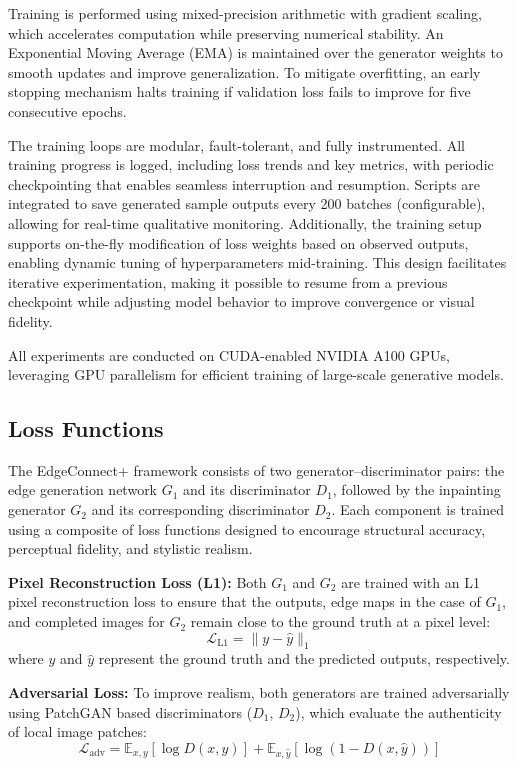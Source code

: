 Training is performed using mixed-precision arithmetic with gradient scaling, which accelerates computation while preserving numerical stability. An Exponential Moving Average (EMA) is maintained over the generator weights to smooth updates and improve generalization. To mitigate overfitting, an early stopping mechanism halts training if validation loss fails to improve for five consecutive epochs.

The training loops are modular, fault-tolerant, and fully instrumented. All training progress is logged, including loss trends and key metrics, with periodic checkpointing that enables seamless interruption and resumption. Scripts are integrated to save generated sample outputs every 200 batches (configurable), allowing for real-time qualitative monitoring. Additionally, the training setup supports on-the-fly modification of loss weights based on observed outputs, enabling dynamic tuning of hyperparameters mid-training. This design facilitates iterative experimentation, making it possible to resume from a previous checkpoint while adjusting model behavior to improve convergence or visual fidelity.

All experiments are conducted on CUDA-enabled NVIDIA A100 GPUs, leveraging GPU parallelism for efficient training of large-scale generative models.



\subsection{Loss Functions}

The EdgeConnect+ framework consists of two generator–discriminator pairs: the edge generation network \(G_1\) and its discriminator \(D_1\), followed by the inpainting generator \(G_2\) and its corresponding discriminator \(D_2\). Each component is trained using a composite of loss functions designed to encourage structural accuracy, perceptual fidelity, and stylistic realism.

\textbf{Pixel Reconstruction Loss (L1):}  
Both \(G_1\) and \(G_2\) are trained with an L1 pixel reconstruction loss to ensure that the outputs, edge maps in the case of \(G_1\), and completed images for \(G_2\) remain close to the ground truth at a pixel level:
\[
\mathcal{L}_{\text{L1}} = \| y - \hat{y} \|_1
\]
where \(y\) and \(\hat{y}\) represent the ground truth and the predicted outputs, respectively.

\textbf{Adversarial Loss:}  
To improve realism, both generators are trained adversarially using PatchGAN based discriminators (\(D_1\), \(D_2\)), which evaluate the authenticity of local image patches:
\[
\mathcal{L}_{\text{adv}} = \mathbb{E}_{x, y}[\log D(x, y)] + \mathbb{E}_{x, \hat{y}}[\log(1 - D(x, \hat{y}))]
\]

